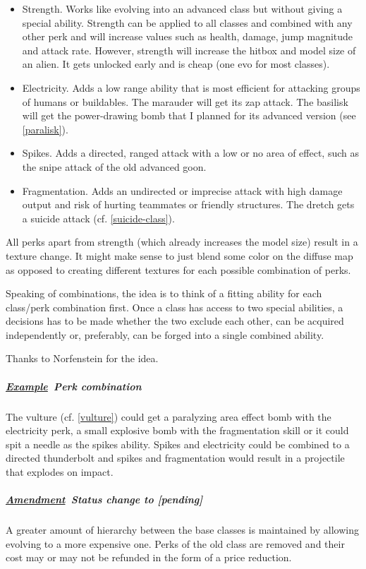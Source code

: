 \documentclass{scrartcl}
\newcommand{\pending}  [0]{\textcolor{pending}  {\textbf{[pending] }}}
\newcommand{\example}  [0]{\textbf{\underline{Example}\ }}
\newcommand{\amendment}[0]{\textbf{\underline{Amendment}\ }}
\begin{document}
\begin{itemize}
\item Strength. Works like evolving into an advanced class but without giving a special ability. Strength can be applied to all classes and combined with any other perk and will increase values such as health, damage, jump magnitude and attack rate. However, strength will increase the hitbox and model size of an alien. It gets unlocked early and is cheap (one evo for most classes).
\item Electricity. Adds a low range ability that is most efficient for attacking groups of humans or buildables. The marauder will get its zap attack. The basilisk will get the power-drawing bomb that I planned for its advanced version (see \ref{paralisk}).
\item Spikes. Adds a directed, ranged attack with a low or no area of effect, such as the snipe attack of the old advanced goon.
\item Fragmentation. Adds an undirected or imprecise attack with high damage output and risk of hurting teammates or friendly structures. The dretch gets a suicide attack (cf. \ref{suicide-class}).
\end{itemize}

All perks apart from strength (which already increases the model size) result in a texture change. It might make sense to just blend some color on the diffuse map as opposed to creating different textures for each possible combination of perks.

Speaking of combinations, the idea is to think of a fitting ability for each class/perk combination first. Once a class has access to two special abilities, a decisions has to be made whether the two exclude each other, can be acquired independently or, preferably, can be forged into a single combined ability.

Thanks to Norfenstein for the idea.

\subparagraph{\example Perk combination}

The vulture (cf. \ref{vulture}) could get a paralyzing area effect bomb with the electricity perk, a small explosive bomb with the fragmentation skill or it could spit a needle as the spikes ability. Spikes and electricity could be combined to a directed thunderbolt and spikes and fragmentation would result in a projectile that explodes on impact.

\subparagraph{\amendment Status change to \pending}

A greater amount of hierarchy between the base classes is maintained by allowing evolving to a more expensive one. Perks of the old class are removed and their cost may or may not be refunded in the form of a price reduction.
\end{document}
